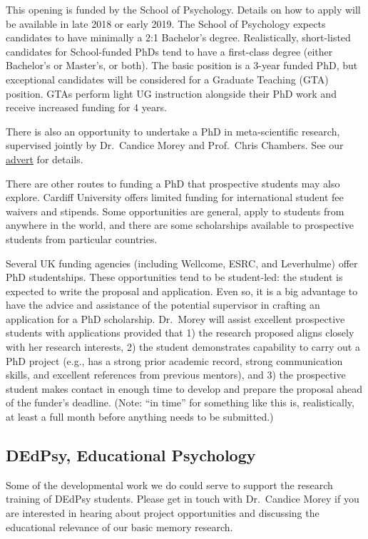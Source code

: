 \documentclass[12pt,]{book}
\theoremstyle{definition}
\theoremstyle{definition}
\theoremstyle{definition}
\theoremstyle{remark}
\begin{document}
This opening is funded by the School of Psychology. Details on how to
apply will be available in late 2018 or early 2019. The School of
Psychology expects candidates to have minimally a 2:1 Bachelor's degree.
Realistically, short-listed candidates for School-funded PhDs tend to
have a first-class degree (either Bachelor's or Master's, or both). The
basic position is a 3-year funded PhD, but exceptional candidates will
be considered for a Graduate Teaching (GTA) position. GTAs perform light
UG instruction alongside their PhD work and receive increased funding
for 4 years.

There is also an opportunity to undertake a PhD in meta-scientific
research, supervised jointly by Dr.~Candice Morey and Prof.~Chris
Chambers. See our
\href{https://www.findaphd.com/search/ProjectDetails.aspx?PJID=100639}{advert}
for details.

There are other routes to funding a PhD that prospective students may
also explore. Cardiff University offers limited funding for
international student fee waivers and stipends. Some opportunities are
general, apply to students from anywhere in the world, and there are
some scholarships available to prospective students from particular
countries.

Several UK funding agencies (including Wellcome, ESRC, and Leverhulme)
offer PhD studentships. These opportunities tend to be student-led: the
student is expected to write the proposal and application. Even so, it
is a big advantage to have the advice and assistance of the potential
supervisor in crafting an application for a PhD scholarship. Dr.~Morey
will assist excellent prospective students with applications provided
that 1) the research proposed aligns closely with her research
interests, 2) the student demonstrates capability to carry out a PhD
project (e.g., has a strong prior academic record, strong communication
skills, and excellent references from previous mentors), and 3) the
prospective student makes contact in enough time to develop and prepare
the proposal ahead of the funder's deadline. (Note: ``in time'' for
something like this is, realistically, at least a full month before
anything needs to be submitted.)

\subsection{DEdPsy, Educational
Psychology}\label{dedpsy-educational-psychology}

Some of the developmental work we do could serve to support the research
training of DEdPsy students. Please get in touch with Dr.~Candice Morey
if you are interested in hearing about project opportunities and
discussing the educational relevance of our basic memory research.
\end{document}
